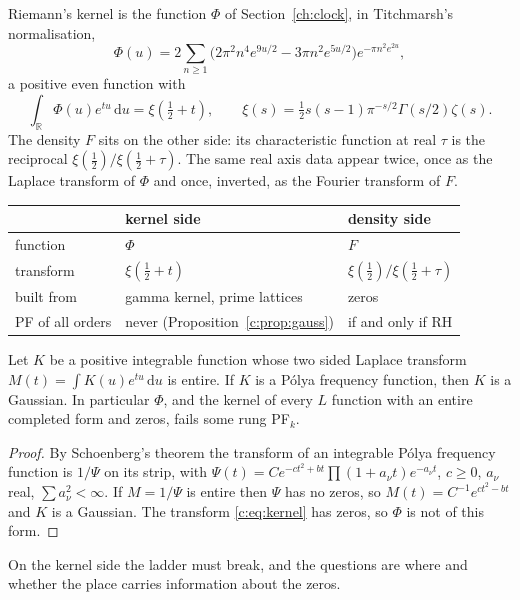 Riemann's kernel is the function $\Phi$ of Section~\ref{ch:clock}, in Titchmarsh's normalisation,
\[
\Phi(u)=2\sum_{n\ge1}\big(2\pi^2n^4e^{9u/2}-3\pi n^2e^{5u/2}\big)e^{-\pi n^2e^{2u}},
\]
a positive even function with
\begin{equation}\label{c:eq:kernel}
\int_{\mathbb R}\Phi(u)e^{tu}\,\mathrm{d}u=\xi(\tfrac12+t),\qquad \xi(s)=\tfrac12s(s-1)\pi^{-s/2}\Gamma(s/2)\zeta(s).
\end{equation}
The density $F$ sits on the other side: its characteristic function at real $\tau$ is the reciprocal $\xi(\frac12)/\xi(\frac12+\tau)$. The same real axis data appear twice, once as the Laplace transform of $\Phi$ and once, inverted, as the Fourier transform of $F$.
\begin{center}
\footnotesize
\begin{tabular}{lll}
\toprule
 & kernel side & density side\\
\midrule
function & $\Phi$ & $F$\\
transform & $\xi(\frac12+t)$ & $\xi(\frac12)/\xi(\frac12+\tau)$\\
built from & gamma kernel, prime lattices & zeros\\
PF of all orders & never (Proposition~\ref{c:prop:gauss}) & if and only if RH\\
\bottomrule
\end{tabular}
\end{center}

\begin{proposition}\label{c:prop:gauss}
Let $K$ be a positive integrable function whose two sided Laplace transform $M(t)=\int K(u)e^{tu}\,\mathrm{d}u$ is entire. If $K$ is a P\'olya frequency function, then $K$ is a Gaussian. In particular $\Phi$, and the kernel of every $L$ function with an entire completed form and zeros, fails some rung PF$_k$.
\end{proposition}

\begin{proof}
By Schoenberg's theorem \cite{Schoenberg51} the transform of an integrable P\'olya frequency function is $1/\Psi$ on its strip, with $\Psi(t)=Ce^{-ct^2+bt}\prod(1+a_\nu t)e^{-a_\nu t}$, $c\ge0$, $a_\nu$ real, $\sum a_\nu^2<\infty$. If $M=1/\Psi$ is entire then $\Psi$ has no zeros, so $M(t)=C^{-1}e^{ct^2-bt}$ and $K$ is a Gaussian. The transform \eqref{c:eq:kernel} has zeros, so $\Phi$ is not of this form.
\end{proof}

On the kernel side the ladder must break, and the questions are where and whether the place carries information about the zeros.

